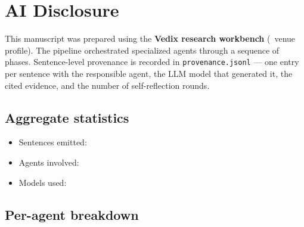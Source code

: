 %
%
%

\section*{AI Disclosure}

This manuscript was prepared using the \textbf{Vedix research workbench}
(\VEDIXVENUE\ venue profile). The pipeline orchestrated specialized
agents through a sequence of phases. Sentence-level provenance is
recorded in \texttt{provenance.jsonl} — one entry per sentence with the
responsible agent, the LLM model that generated it, the cited evidence,
and the number of self-reflection rounds.

\subsection*{Aggregate statistics}

\begin{itemize}
  \item Sentences emitted: \VEDIXSENTENCES
  \item Agents involved: \VEDIXAGENTS
  \item Models used: \VEDIXMODELS
\end{itemize}

\subsection*{Per-agent breakdown}

\begin{itemize}
\VEDIXAGENTSTABLE
\end{itemize}

